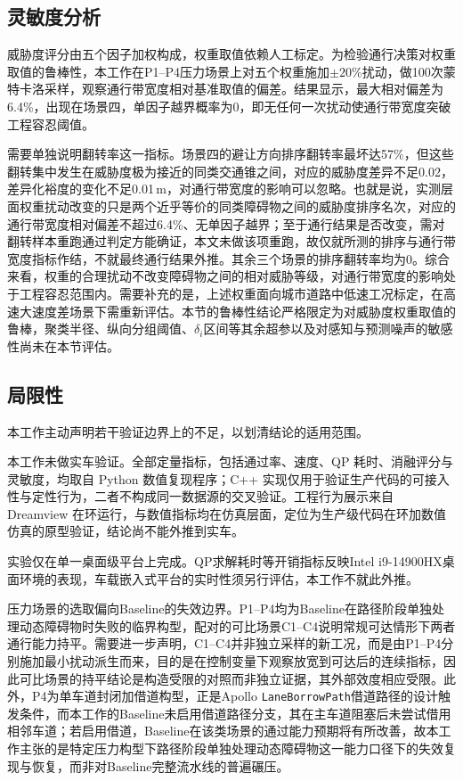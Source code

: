 \documentclass[a4paper,11pt]{ctexart}
\theoremstyle{definition}
\begin{document}
\subsection{灵敏度分析}
\label{subsec:exp_sensitivity}

威胁度评分由五个因子加权构成，权重取值依赖人工标定。为检验通行决策对权重取值的鲁棒性，本工作在P1--P4压力场景上对五个权重施加$\pm 20\%$扰动，做100次蒙特卡洛采样，观察通行带宽度相对基准取值的偏差。结果显示，最大相对偏差为6.4\%，出现在场景四，单因子越界概率为0，即无任何一次扰动使通行带宽度突破工程容忍阈值。

需要单独说明翻转率这一指标。场景四的避让方向排序翻转率最坏达57\%，但这些翻转集中发生在威胁度极为接近的同类交通锥之间，对应的威胁度差异不足0.02，差异化裕度的变化不足0.01\,m，对通行带宽度的影响可以忽略。也就是说，实测层面权重扰动改变的只是两个近乎等价的同类障碍物之间的威胁度排序名次，对应的通行带宽度相对偏差不超过6.4\%、无单因子越界；至于通行结果是否改变，需对翻转样本重跑通过判定方能确证，本文未做该项重跑，故仅就所测的排序与通行带宽度指标作结，不就最终通行结果外推。其余三个场景的排序翻转率均为0。综合来看，权重的合理扰动不改变障碍物之间的相对威胁等级，对通行带宽度的影响处于工程容忍范围内。需要补充的是，上述权重面向城市道路中低速工况标定，在高速大速度差场景下需重新评估。本节的鲁棒性结论严格限定为对威胁度权重取值的鲁棒，聚类半径、纵向分组阈值、$\delta_i$区间等其余超参以及对感知与预测噪声的敏感性尚未在本节评估。

\subsection{局限性}
\label{subsec:exp_limitations}

本工作主动声明若干验证边界上的不足，以划清结论的适用范围。

本工作未做实车验证。全部定量指标，包括通过率、速度、QP 耗时、消融评分与灵敏度，均取自 Python 数值复现程序；C++ 实现仅用于验证生产代码的可接入性与定性行为，二者不构成同一数据源的交叉验证。工程行为展示来自 Dreamview 在环运行，与数值指标均在仿真层面，定位为生产级代码在环加数值仿真的原型验证，结论尚不能外推到实车。

实验仅在单一桌面级平台上完成。QP求解耗时等开销指标反映Intel i9-14900HX桌面环境的表现，车载嵌入式平台的实时性须另行评估，本工作不就此外推。

压力场景的选取偏向Baseline的失效边界。P1--P4均为Baseline在路径阶段单独处理动态障碍物时失败的临界构型，配对的可比场景C1--C4说明常规可达情形下两者通行能力持平。需要进一步声明，C1--C4并非独立采样的新工况，而是由P1--P4分别施加最小扰动派生而来，目的是在控制变量下观察放宽到可达后的连续指标，因此可比场景的持平结论是构造受限的对照而非独立证据，其外部效度相应受限。此外，P4为单车道封闭加借道构型，正是Apollo \texttt{LaneBorrowPath}借道路径的设计触发条件，而本工作的Baseline未启用借道路径分支，其在主车道阻塞后未尝试借用相邻车道；若启用借道，Baseline在该类场景的通过能力预期将有所改善，故本工作主张的是特定压力构型下路径阶段单独处理动态障碍物这一能力口径下的失效复现与恢复，而非对Baseline完整流水线的普遍碾压。
\end{document}
